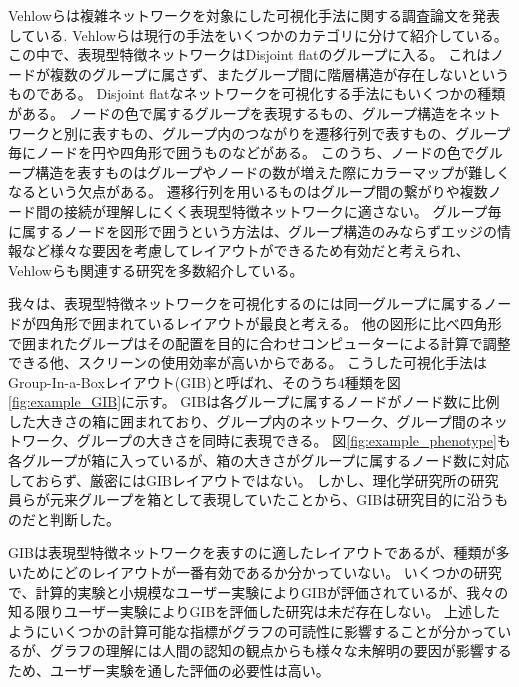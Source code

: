 \documentclass{kuee}
\begin{document}
Vehlowらは複雑ネットワークを対象にした可視化手法に関する調査論文を発表している\cite{Vehlow2017VisualizingGS}.
Vehlowらは現行の手法をいくつかのカテゴリに分けて紹介している。
この中で、表現型特徴ネットワークはDisjoint flatのグループに入る。
これはノードが複数のグループに属さず、またグループ間に階層構造が存在しないというものである。
Disjoint flatなネットワークを可視化する手法にもいくつかの種類がある。
ノードの色で属するグループを表現するもの、グループ構造をネットワークと別に表すもの、グループ内のつながりを遷移行列で表すもの、グループ毎にノードを円や四角形で囲うものなどがある。
このうち、ノードの色でグループ構造を表すものはグループやノードの数が増えた際にカラーマップが難しくなるという欠点がある。
遷移行列を用いるものはグループ間の繋がりや複数ノード間の接続が理解しにくく表現型特徴ネットワークに適さない。
グループ毎に属するノードを図形で囲うという方法は、グループ構造のみならずエッジの情報など様々な要因を考慮してレイアウトができるため有効だと考えられ、Vehlowらも関連する研究を多数紹介している。

我々は、表現型特徴ネットワークを可視化するのには同一グループに属するノードが四角形で囲まれているレイアウトが最良と考える。
他の図形に比べ四角形で囲まれたグループはその配置を目的に合わせコンピューターによる計算で調整できる他、スクリーンの使用効率が高いからである。
こうした可視化手法はGroup-In-a-Boxレイアウト(GIB)と呼ばれ、そのうち4種類を図\ref{fig:example_GIB}に示す。
GIBは各グループに属するノードがノード数に比例した大きさの箱に囲まれており、グループ内のネットワーク、グループ間のネットワーク、グループの大きさを同時に表現できる。
図\ref{fig:example_phenotype}も各グループが箱に入っているが、箱の大きさがグループに属するノード数に対応しておらず、厳密にはGIBレイアウトではない。
しかし、理化学研究所の研究員らが元来グループを箱として表現していたことから、GIBは研究目的に沿うものだと判断した。

GIBは表現型特徴ネットワークを表すのに適したレイアウトであるが、種類が多いためにどのレイアウトが一番有効であるか分かっていない。
いくつかの研究\cite{onoue2017optimal,chaturvedi2014group}で、計算的実験と小規模なユーザー実験によりGIBが評価されているが、我々の知る限りユーザー実験によりGIBを評価した研究は未だ存在しない。
上述したようにいくつかの計算可能な指標がグラフの可読性に影響することが分かっている\cite{harel2000fast,koren2003drawing,hachul2004drawing,giacomo}が、グラフの理解には人間の認知の観点からも様々な未解明の要因が影響するため、ユーザー実験を通した評価の必要性は高い。
\end{document}
